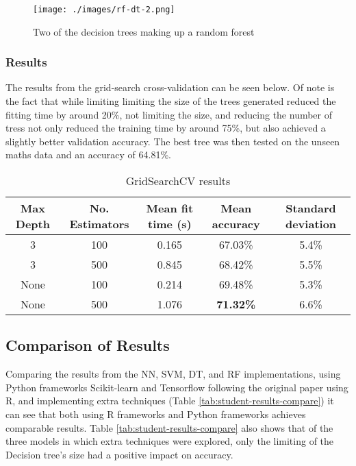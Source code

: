 \documentclass[12pt,a4paper,titlepage,twoside]{report}
\begin{document}
	\begin{figure}[h]
		\centering
		\texttt{[image: ./images/rf-dt-2.png]}
		\caption{Two of the decision trees making up a random forest}
		\label{rf-dts}
	\end{figure}
	
	
\subsubsection*{Results}
	The results from the grid-search cross-validation can be seen below. Of note is the fact that while limiting limiting the size of the trees generated reduced the fitting time by around 20\%, not limiting the size, and reducing the number of tress not only reduced the training time by around 75\%, but also achieved a slightly better validation accuracy. The best tree was then tested on the unseen maths data and an accuracy of 64.81\%.

	\begin{table}
		\centering
		\begin{tabular}{|c|c|c|c|c|}
			\hline
			\textbf{Max Depth} 	& \textbf{No. Estimators} & \textbf{Mean fit time} (s) 	& \textbf{Mean accuracy} 	& \textbf{Standard deviation}	\\ 
			\hline
			3 		& 100 	& 0.165 	& 67.03\%  & 5.4\% \\
			3 		& 500 	& 0.845 	& 68.42\%  & 5.5\% \\
			None 	& 100 	& 0.214 	& 69.48\%  & 5.3\% \\
			None 	& 500 	& 1.076 	& \textbf{71.32\%}  & 6.6\% \\
			\hline
		\end{tabular}
		\caption{GridSearchCV results}
		\label{tab:rf-results}
	\end{table}
	
\subsection{Comparison of Results}
	Comparing the results from the NN, SVM, DT, and RF implementations, using Python frameworks Scikit-learn and Tensorflow following the original paper using R, and implementing extra techniques (Table \ref{tab:student-results-compare}) it can see that both using R frameworks and Python frameworks achieves comparable results. Table \ref{tab:student-results-compare} also shows that of the three models in which extra techniques were explored, only the limiting of the Decision tree's size had a positive impact on accuracy.
	
\end{document}
